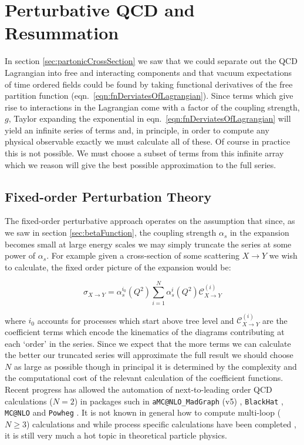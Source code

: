 \section{Perturbative QCD and Resummation}
	\label{sec:pqcdAndResum}

	In section \ref{sec:partonicCrossSection} we saw that we could separate out the QCD Lagrangian into
	free and interacting components and that vacuum expectations of time ordered fields could be found by
	taking functional derivatives of the free partition function (eqn.~\eqref{eqn:fnDerviatesOfLagrangian}).
	Since terms which give rise to interactions in the Lagrangian come with a factor of the coupling strength,
	$g$, Taylor expanding the exponential in eqn.~\eqref{eqn:fnDerviatesOfLagrangian} will yield an infinite
	series of terms and, in principle, in order to compute any physical observable exactly we must calculate
	all of these.  Of course in practice this is not possible.  We must choose a subset of terms from
	this infinite array which we reason will give the best possible approximation to the full series.

	\subsection{Fixed-order Perturbation Theory}

		The fixed-order perturbative approach operates on the assumption that since, as we saw in section \ref{sec:betaFunction},
		the coupling strength $\alpha_s$ in the expansion becomes small at large energy scales we may simply truncate the series at some
		power of $\alpha_s$.  For example given a cross-section of some scattering $X\rightarrow Y$ we wish to calculate, the fixed
		order picture of the expansion would be:

		\begin{equation}
			\sigma_{X\rightarrow Y} = \alpha_s^{i_0}(Q^2)\sum_{i=1}^N\alpha_s^{i}(Q^2)\mathcal{C}^{(i)}_{X\rightarrow Y}
		\end{equation}

		where $i_0$ accounts for processes which start above tree level and $\mathcal{C}^{(i)}_{X\rightarrow Y}$
		are the coefficient terms which encode the kinematics of the diagrams contributing at each `order'
		in the series.  Since we expect that the more terms we can calculate the better our
		truncated series will approximate the full result we should choose $N$ as large as possible though in principal
		it is determined by the complexity and the computational cost of the relevant calculation of the coefficient
		functions.  Recent progress has allowed the automation of next-to-leading order QCD calculations ($N=2$) in
		packages such in \texttt{aMC@NLO\_MadGraph} (v5) \cite{Alwall:2011uj}, \texttt{BlackHat} \cite{Bern:2012my}, \texttt{MC@NLO}
		\cite{Frixione:2010wd} and \texttt{Powheg} \cite{Frixione:2007vw}. It is not known in general how to compute
		multi-loop ($N\geq3$) calculations and while process specific calculations have been completed
		\cite{Cacciari:2015jma, Grazzini:2015nwa, Gehrmann:2014fva}, it is still very much a hot topic in theoretical particle
		physics.

